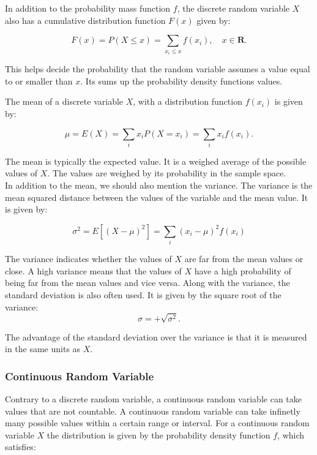 \noindent In addition to the probability mass function $f$, the discrete random variable $X$ also has a cumulative distribution function $F(x)$ given by:

\begin{equation}
F(x) = P(X \leq x) = \sum_{x_i \leq x} f(x_i), \quad x \in \textbf{R}.
\end{equation}


\noindent This helps decide the probability that the random variable assumes a value equal to or smaller than $x$. Its sums up the probability density functions values.
\newline

\noindent The mean of a discrete variable $X$, with a distribution function $f(x_{i})$ is given by:

\begin{equation}
\mu = E(X) = \sum_i x_i P(X = x_i) = \sum_i x_i f(x_i).
\end{equation}

\noindent The mean is typically the expected value. It is a weighed average of the possible values of $X$. The values are weighed by its probability in the sample space.
\\

\noindent In addition to the mean, we should also mention the variance. The variance is the mean squared distance between the values of the variable and the mean value. It is given by:

\begin{equation}
\sigma^2 = E\left[(X - \mu)^2\right] = \sum_{i} (x_i - \mu)^2 f(x_i)
\end{equation}

\noindent The variance indicates whether the values of $X$ are far from the mean values or close. A high variance means that the values of $X$ have a high probability of being far from the mean values and vice versa. Along with the variance, the standard deviation is also often used. It is given by the square root of the variance:
\begin{equation}
\sigma=+\sqrt{\sigma^2}.
\end{equation}

\noindent The advantage of the standard deviation over the variance is that it is measured in the same units as $X$.

\subsubsection{Continuous Random Variable}
Contrary to a discrete random variable, a continuous random variable can take values that are not countable. A continuous random variable can take infinetly many possible values within a certain range or interval. For a continuous random variable $X$ the distribution is given by the probability density function $f$, which satisfies:

